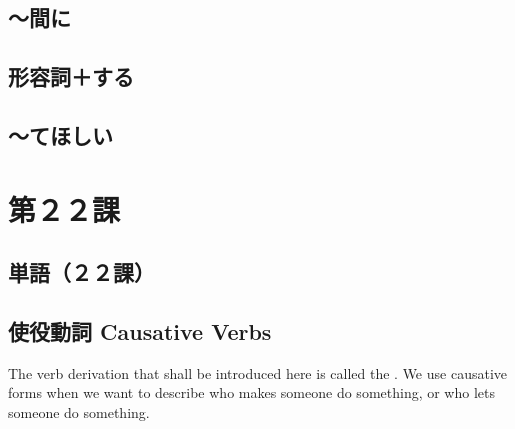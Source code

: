 \documentclass[notoc,notitlepage]{tufte-book}
\begin{document}

\section{〜間に}%
\label{sec:aidani}




\section{形容詞＋する}%
\label{sec:keiyoushi_suru}




\section{〜てほしい}%
\label{sec:tehoshii}





\chapter{第２２課}%
\label{chp:dai_22_ka}

\section{単語（２２課）}%
\label{sec:tango_c22}




\section{使役動詞 Causative Verbs}%
\label{sec:shiekidoushi_causative_verbs}

The verb derivation that shall be introduced here is called the
. We use causative forms when we want to describe
who makes someone do something, or who lets someone do something.
\end{document}
